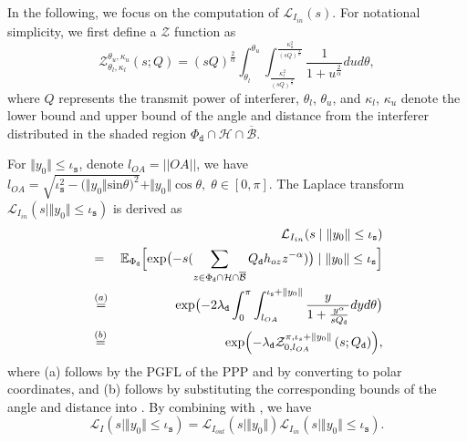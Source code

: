 \documentclass[twocolumn,english]{IEEEtran}
\theoremstyle{plain}
\theoremstyle{definition}
\begin{document}
In the following, we focus on the computation of $\mathcal{L}_{I_{in}}(s)$.
For notational simplicity, we first define a $\mathcal{Z}$ function
as
\begin{equation}
\mathcal{Z}_{\theta_{l},\kappa_{l}}^{\theta_{u},\kappa_{u}}\left(s;Q\right)=\left(sQ\right)^{\frac{2}{\alpha}}\int_{\theta_{l}}^{\theta_{u}}\int_{\frac{\kappa_{l}^{2}}{(sQ)^{\frac{2}{\alpha}}}}^{\frac{\kappa_{u}^{2}}{\left(sQ\right)^{\frac{2}{\alpha}}}}\frac{1}{1+u^{\frac{2}{\alpha}}}dud\theta,\label{eq:Z_func}
\end{equation}
where $Q$ represents the transmit power of interferer, $\theta_{l}$,
$\theta_{u}$, and $\kappa_{l}$, $\kappa_{u}$ denote the lower bound
and upper bound of the angle and distance from the interferer distributed
in the shaded region $\Phi_{\mathtt{d}}\cap\mathcal{H}\cap\overline{\mathcal{B}}$.

For $\Vert y_{0}\Vert\leq\iota_{\mathtt{s}}$, denote $l_{OA}=||OA||$,
we have $l_{OA}=\sqrt{\iota_{\mathtt{s}}^{2}-\bigl(\Vert y_{0}\Vert\textrm{sin}\theta\bigr)^{2}}+\Vert y_{0}\Vert\cos\theta,\;\theta\in[0,\pi].$
The Laplace transform $\mathcal{L}_{I_{in}}(s\mid\Vert y_{0}\Vert\leq\iota_{\mathtt{s}})$
is derived as
\begin{eqnarray}
 &  & \mathcal{L}_{I_{in}}(s\mid\Vert y_{0}\Vert\leq\iota_{\mathtt{s}})\nonumber \\
 & = & \mathbb{E}_{\Phi_{\mathtt{d}}}\Bigl[\exp\bigl(-s(\sum_{z\in\Phi_{\mathtt{d}}\cap\mathcal{H}\cap\overline{\mathcal{B}}}Q_{\mathtt{d}}h_{oz}z^{-\alpha})\bigr)\mid\Vert y_{0}\Vert\leq\iota_{\mathtt{s}}\Bigr]\nonumber \\
 & \overset{(a)}{=} & \exp\bigl(-2\lambda_{\mathtt{d}}\int_{0}^{\pi}\int_{l_{OA}}^{\iota_{\mathtt{s}}+\Vert y_{0}\Vert}\frac{y}{1+\frac{y^{\alpha}}{sQ_{\mathtt{d}}}}dyd\theta\bigr)\nonumber \\
 & \overset{(b)}{=} & \exp\Bigl(-\lambda_{\mathtt{d}}\mathcal{Z}_{0,l_{OA}}^{\pi,\iota_{s}+\Vert y_{0}\Vert}\left(s;Q_{\mathtt{d}}\right)\Bigr),\label{eq:I_in}
\end{eqnarray}
where (a) follows by the PGFL of the PPP and by converting to polar
coordinates, and (b) follows by substituting the corresponding bounds
of the angle and distance into . By combining
 with , we have
\begin{equation}
\mathcal{L}_{I}(s\mid\Vert y_{0}\Vert\leq\iota_{\mathtt{s}})=\mathcal{L}_{I_{out}}(s\mid\Vert y_{0}\Vert)\mathcal{L}_{I_{in}}(s\mid\Vert y_{0}\Vert\leq\iota_{\mathtt{s}}).
\end{equation}
\end{document}
